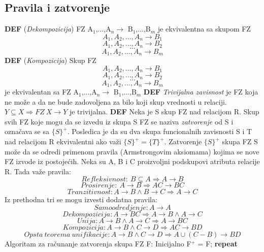 \documentclass{article}
\begin{document}
\subsection{Pravila i zatvorenje}
\textbf{DEF} (\textit{Dekompozicija}) FZ A$_1$,...,A$_n \rightarrow
$ B$_1$,...,B$_m$ je ekvivalentna sa skupom FZ 
$$ A_1,A_2,...,A_n \rightarrow B_1  $$
$$ A_1,A_2,...,A_n \rightarrow B_2 $$
$$ ... $$
$$ A_1,A_2,...,A_n \rightarrow B_m $$
\textbf{DEF} (\textit{Kompozicija}) Skup FZ
$$ A_1,A_2,...,A_n \rightarrow B_1  $$
$$ A_1,A_2,...,A_n \rightarrow B_2 $$
$$ ... $$
$$ A_1,A_2,...,A_n \rightarrow B_m $$
je ekvivalentan sa FZ A$_1$,...,A$_n \rightarrow $ B$_1$,...,B$_m$
\vspace{0.8cm} \newline
\textbf{DEF} \textit{Trivijalna zavisnost} je FZ koja ne može a da
ne bude zadovoljena za bilo koji skup vrednosti u relaciji. 
$Y \subseteq X \Rightarrow FZ\ X \rightarrow Y $ je trivijalna.
\vspace{0.2cm} \newline
\textbf{DEF} Neka je S skup FZ nad relacijom R. Skup svih FZ koje
mogu da se izvedu iz skupa S FZ se naziva \textit{zatvorenje} od S i
označava se sa $\{S\}^+$.
\newline
Posledica je da su dva skupa funcionalnih zavisnosti S i T nad
relacijom R ekvivalentni ako važi $\{S\}^+ = \{T\}^+$.
\newline
Zatvorenje $\{S\}^+$ skupa FZ S može da se odredi primenom pravila
(Armstrongovim aksiomama) kojima se nove FZ izvode iz postojećih.
Neka su A, B i C proizvoljni podskupovi atributa relacije R. Tada 
važe pravila:
$$ Refleksivnost:\ B \subseteq A \Rightarrow A \rightarrow B $$
$$ Prosirenje:\ A \rightarrow B \Rightarrow AC \rightarrow BC $$
$$ Tranzitivnost: A \rightarrow B \wedge B \rightarrow C \Rightarrow 
A \rightarrow C $$
Iz prethodna tri se mogu izvesti dodatna pravila:
$$ Samoodredjenje: A \rightarrow A $$
$$ Dekompozicija: A \rightarrow BC \Rightarrow A \rightarrow B \wedge
A \rightarrow C $$
$$ Unija: A \rightarrow B \wedge A \rightarrow C \Rightarrow A 
\rightarrow BC $$
$$ Kompozicija: A \rightarrow B \wedge C \rightarrow D \Rightarrow
AC \rightarrow BD $$
$$ Opsta\ teorema\ unifikacije: A \rightarrow B \wedge C \rightarrow
D \Rightarrow A \cup (C-B) \rightarrow BD $$
Algoritam za računanje zatvorenja skupa FZ F:
\newline
\hspace*{0.4cm}Inicijalno F$^+$ = F; \newline
\hspace*{0.4cm}\textbf{repeat} \newline
\end{document}
